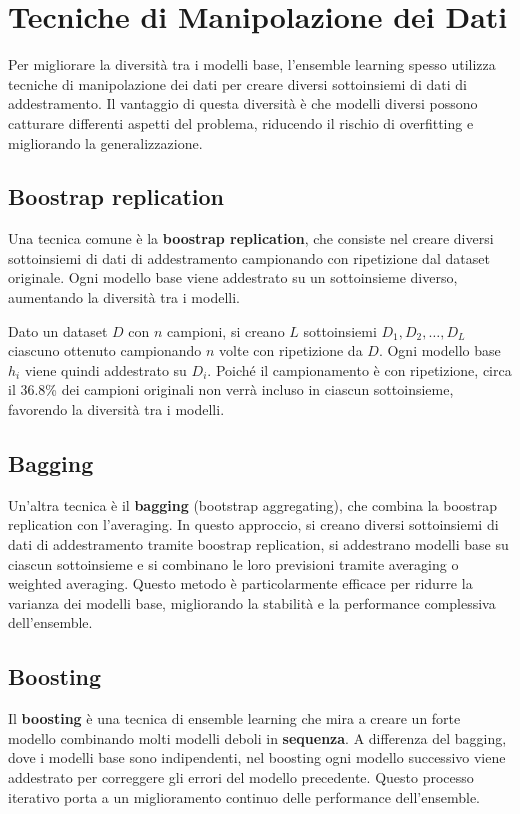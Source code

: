\section{Tecniche di Manipolazione dei Dati}
Per migliorare la diversità tra i modelli base, l'ensemble learning spesso utilizza tecniche di manipolazione dei dati per creare diversi sottoinsiemi di dati di addestramento. Il vantaggio di questa diversità è che modelli diversi possono catturare differenti aspetti del problema, riducendo il rischio di overfitting e migliorando la generalizzazione.

\subsection{Boostrap replication}
Una tecnica comune è la \textbf{boostrap replication}, che consiste nel creare diversi sottoinsiemi di dati di addestramento campionando con ripetizione dal dataset originale. Ogni modello base viene addestrato su un sottoinsieme diverso, aumentando la diversità tra i modelli.

Dato un dataset $D$ con $n$ campioni, si creano $L$ sottoinsiemi $D_1, D_2, \ldots, D_L$ ciascuno ottenuto campionando $n$ volte con ripetizione da $D$. Ogni modello base $h_i$ viene quindi addestrato su $D_i$. Poiché il campionamento è con ripetizione, circa il 36.8\% dei campioni originali non verrà incluso in ciascun sottoinsieme, favorendo la diversità tra i modelli.

\subsection{Bagging}
Un'altra tecnica è il \textbf{bagging} (bootstrap aggregating), che combina la boostrap replication con l'averaging. In questo approccio, si creano diversi sottoinsiemi di dati di addestramento tramite boostrap replication, si addestrano modelli base su ciascun sottoinsieme e si combinano le loro previsioni tramite averaging o weighted averaging. Questo metodo è particolarmente efficace per ridurre la varianza dei modelli base, migliorando la stabilità e la performance complessiva dell'ensemble.

\subsection{Boosting}
Il \textbf{boosting} è una tecnica di ensemble learning che mira a creare un forte modello combinando molti modelli deboli in \textbf{sequenza}. A differenza del bagging, dove i modelli base sono indipendenti, nel boosting ogni modello successivo viene addestrato per correggere gli errori del modello precedente. Questo processo iterativo porta a un miglioramento continuo delle performance dell'ensemble.


